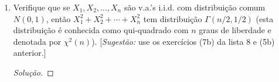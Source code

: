 \documentclass[../Notas.tex]{subfiles}
\begin{document}
\begin{enumerate}
\begin{enumerate}[a)]
    \item $X\sim N(\mu_1, \sigma_1^2)$ e $Y\sim N(\mu_2, \sigma_2^2)$
    \end{enumerate}
    \begin{proof}[Solução]
        \begin{enumerate}
            \item Para $z>0$, temos
            \begin{align*}
                f_{X+Y}(z) &= \int_{\mathbb{R}} f_{X,Y}(x, z-x) \, dx \\
                           &= \lambda_1\lambda_2e^{-\lambda_2z}
                           \int_0^z e^{(\lambda_2 - \lambda_1)x} \, dx \\
                           &= \frac{\lambda_1\lambda_2}{\lambda_2 - \lambda_1}
                           (e^{-\lambda_1z} - e^{-\lambda_2z}).
            \end{align*}
            Do contrário, $f_{X+Y}(z) = 0.$
            \item Para $z>0$, temos
            \begin{align*}
                f_{X+Y}(z) &= \frac{\lambda_1^{\alpha_1 + \alpha_2}
                e^{-\lambda z}}{\Gamma(\alpha_1)\Gamma(\alpha_2)} 
                \int_0^z x^{\alpha_1 - 1}(z-x)^{\alpha_2 - 1} \, dx \\
                &= \frac{\lambda^{\alpha_1+\alpha_2}z^{\alpha_1+\alpha_2-1}}
                {\Gamma(\alpha_1+\alpha_2)}e^{-\lambda z}.
            \end{align*}
            Do contrário, $f_{X+Y}(z) = 0$. Logo, $X+Y\sim\text{Gama}(\alpha_1+\alpha_2, \lambda)$.
            \item Por simplicidade, supomos $\mu_1 = 0 = \mu_2$. Realizando contas análogas às acima,
            obtemos que $X+Y\sim N(0, \sigma_1^2 + \sigma_2^2)$. Daí, basta somar $\mu_1 + \mu_2$
            para obter que $X+Y\sim N(\mu_1+\mu_2, \sigma_1^2 + \sigma_2^2)$.
        \end{enumerate}
    \end{proof}
    \item Verifique que se $X_1, X_2,\dots, X_n$ são v.a.’s i.i.d. com distribuição comum $N(0,1)$, então $X_1^2 + X_2^2 + \cdots + X_n^2$ tem distribuição $\Gamma(n/2, 1/2)$ (esta distribuição é conhecida como qui-quadrado com $n$ graus de liberdade e denotada por $\chi^2(n)$). [\textit{Sugestão:} use os exercícios (7b) da lista 8 e (5b) anterior.]
    \begin{proof}[Solução]

\end{proof}
\end{enumerate}
\end{document}

